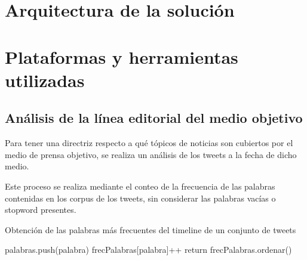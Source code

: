 \section{Arquitectura de la solución}
	
	
	
	
\section{Plataformas y herramientas utilizadas}







\subsection{Análisis de la línea editorial del medio objetivo}

Para tener una directriz respecto a qué tópicos de noticias son cubiertos por el medio de prensa objetivo, se realiza un análisis de los tweets a la fecha de dicho medio.

Este proceso se realiza mediante el conteo de la frecuencia de las palabras contenidas en los corpus de los tweets, sin considerar las palabras vacías o stopword presentes.

\begin{algorithm}
	\caption{Obtención de las palabras más frecuentes del timeline de un conjunto de tweets}\label{ciudadesLeven}
	\begin{algorithmic}[1]
		\State palabras.push(palabra)
		\State frecPalabras[palabra]++
		\EndIf
		\EndFor
		\EndFor
		\EndFor
		\State return frecPalabras.ordenar()
		\EndFunction
	\end{algorithmic}
\end{algorithm}



